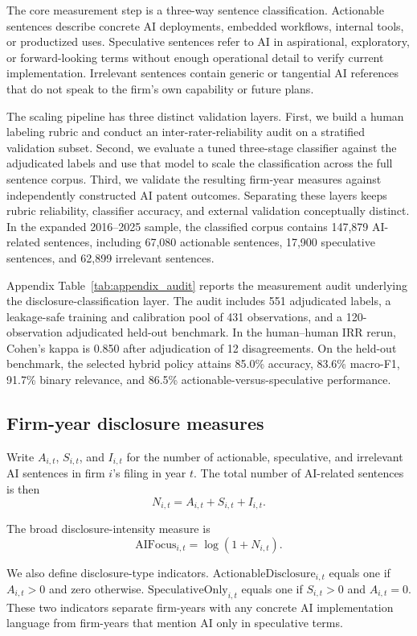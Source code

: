 The core measurement step is a three-way sentence classification. Actionable sentences describe concrete AI deployments, embedded workflows, internal tools, or productized uses. Speculative sentences refer to AI in aspirational, exploratory, or forward-looking terms without enough operational detail to verify current implementation. Irrelevant sentences contain generic or tangential AI references that do not speak to the firm's own capability or future plans.

The scaling pipeline has three distinct validation layers. First, we build a human labeling rubric and conduct an inter-rater-reliability audit on a stratified validation subset. Second, we evaluate a tuned three-stage classifier against the adjudicated labels and use that model to scale the classification across the full sentence corpus. Third, we validate the resulting firm-year measures against independently constructed AI patent outcomes. Separating these layers keeps rubric reliability, classifier accuracy, and external validation conceptually distinct. In the expanded 2016--2025 sample, the classified corpus contains 147,879 AI-related sentences, including 67,080 actionable sentences, 17,900 speculative sentences, and 62,899 irrelevant sentences.

Appendix Table~\ref{tab:appendix_audit} reports the measurement audit underlying the disclosure-classification layer. The audit includes 551 adjudicated labels, a leakage-safe training and calibration pool of 431 observations, and a 120-observation adjudicated held-out benchmark. In the human--human IRR rerun, Cohen's kappa is 0.850 after adjudication of 12 disagreements. On the held-out benchmark, the selected hybrid policy attains 85.0\% accuracy, 83.6\% macro-F1, 91.7\% binary relevance, and 86.5\% actionable-versus-speculative performance.

\subsection{Firm-year disclosure measures}

Write $A_{i,t}$, $S_{i,t}$, and $I_{i,t}$ for the number of actionable, speculative, and irrelevant AI sentences in firm $i$'s filing in year $t$. The total number of AI-related sentences is then
\[
N_{i,t} = A_{i,t} + S_{i,t} + I_{i,t}.
\]

The broad disclosure-intensity measure is
\[
\mathrm{AIFocus}_{i,t} = \log(1 + N_{i,t}).
\]

We also define disclosure-type indicators. $\mathrm{ActionableDisclosure}_{i,t}$ equals one if $A_{i,t} > 0$ and zero otherwise. $\mathrm{SpeculativeOnly}_{i,t}$ equals one if $S_{i,t} > 0$ and $A_{i,t} = 0$. These two indicators separate firm-years with any concrete AI implementation language from firm-years that mention AI only in speculative terms.

